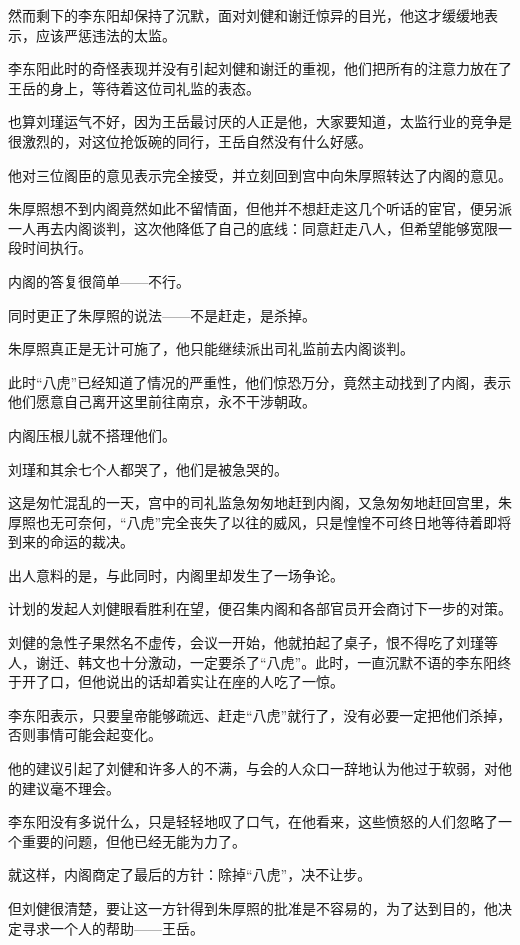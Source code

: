 \begin{multicols}{\theparacolNo}
然而剩下的李东阳却保持了沉默，面对刘健和谢迁惊异的目光，他这才缓缓地表示，应该严惩违法的太监。

李东阳此时的奇怪表现并没有引起刘健和谢迁的重视，他们把所有的注意力放在了王岳的身上，等待着这位司礼监的表态。

也算刘瑾运气不好，因为王岳最讨厌的人正是他，大家要知道，太监行业的竞争是很激烈的，对这位抢饭碗的同行，王岳自然没有什么好感。

他对三位阁臣的意见表示完全接受，并立刻回到宫中向朱厚照转达了内阁的意见。

朱厚照想不到内阁竟然如此不留情面，但他并不想赶走这几个听话的宦官，便另派一人再去内阁谈判，这次他降低了自己的底线：同意赶走八人，但希望能够宽限一段时间执行。

内阁的答复很简单——不行。

同时更正了朱厚照的说法——不是赶走，是杀掉。

朱厚照真正是无计可施了，他只能继续派出司礼监前去内阁谈判。

此时“八虎”已经知道了情况的严重性，他们惊恐万分，竟然主动找到了内阁，表示他们愿意自己离开这里前往南京，永不干涉朝政。

内阁压根儿就不搭理他们。

刘瑾和其余七个人都哭了，他们是被急哭的。

这是匆忙混乱的一天，宫中的司礼监急匆匆地赶到内阁，又急匆匆地赶回宫里，朱厚照也无可奈何，“八虎”完全丧失了以往的威风，只是惶惶不可终日地等待着即将到来的命运的裁决。

出人意料的是，与此同时，内阁里却发生了一场争论。

计划的发起人刘健眼看胜利在望，便召集内阁和各部官员开会商讨下一步的对策。

刘健的急性子果然名不虚传，会议一开始，他就拍起了桌子，恨不得吃了刘瑾等人，谢迁、韩文也十分激动，一定要杀了“八虎”。此时，一直沉默不语的李东阳终于开了口，但他说出的话却着实让在座的人吃了一惊。

李东阳表示，只要皇帝能够疏远、赶走“八虎”就行了，没有必要一定把他们杀掉，否则事情可能会起变化。

他的建议引起了刘健和许多人的不满，与会的人众口一辞地认为他过于软弱，对他的建议毫不理会。

李东阳没有多说什么，只是轻轻地叹了口气，在他看来，这些愤怒的人们忽略了一个重要的问题，但他已经无能为力了。

就这样，内阁商定了最后的方针：除掉“八虎”，决不让步。

但刘健很清楚，要让这一方针得到朱厚照的批准是不容易的，为了达到目的，他决定寻求一个人的帮助——王岳。


\end{multicols}
